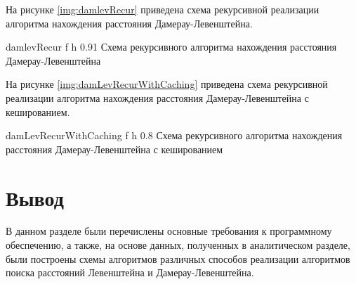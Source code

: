 \clearpage

На рисунке \ref{img:damlevRecur} приведена схема рекурсивной реализации алгоритма нахождения расстояния Дамерау-Левенштейна.

{damlevRecur} %
{f} %
{h} %
{0.91\textwidth} %
{Схема рекурсивного алгоритма нахождения расстояния Дамерау-Левенштейна} %

\clearpage

На рисунке \ref{img:damLevRecurWithCaching} приведена схема рекурсивной реализации алгоритма нахождения расстояния Дамерау-Левенштейна с кешированием.

{damLevRecurWithCaching} %
{f} %
{h} %
{0.8\textwidth} %
{Схема рекурсивного алгоритма нахождения расстояния Дамерау-Левенштейна с кешированием} %

\clearpage

\section*{Вывод}

В данном разделе были перечислены основные требования к программному обеспечению, а также, на основе  данных, полученных в аналитическом разделе, были построены схемы алгоритмов различных способов реализации алгоритмов поиска расстояний Левенштейна и Дамерау-Левенштейна.

